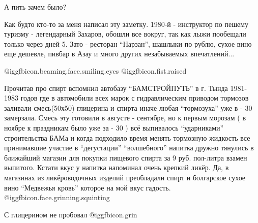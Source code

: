\begin{itemize}
А пить зачем было?


Как будто кто-то за меня написал эту заметку. 1980-й - инструктор по пешему
туризму - легендарный Захаров, обошли все вокруг, так как лыжи пообещали только
через дней 5. Зато - ресторан \enquote{Нарзан}, шашлыки по рублю, сухое вино еще
дешевле, пивбар в Азау и много других незабываемых впечатлений...

 @igg{fbicon.beaming.face.smiling.eyes}  @igg{fbicon.fist.raised} 


Прочитав про спирт вспомнил автобазу \enquote{БАМСТРОЙПУТЬ} в г. Тында 1981- 1983 годов
где в автомобили всех марок с гидравлическим приводом тормозов заливали
смесь(50х50) глицерина и спирта иначе любая \enquote{тормозуха} уже в - 30 замерзала.
Смесь эту готовили в августе - сентябре, но к первым морозам ( в ноябре к
праздникам было уже за - 30 ) всё выпивалось \enquote{ударниками} строительства БАМа и
когда подходило время менять тормозную жидкость все принимавшие участие в
\enquote{дегустации} \enquote{волшебного} напитка дружно тянулись в ближайший магазин для
покупки пищевого спирта за 9 руб. пол-литра взамен выпитого. Кстати вкус у
напитка напоминал очень крепкий ликёр. Да, в магазинах из ликёроводочных
изделий преобладали спирт и болгарское сухое вино \enquote{Медвежья кровь} которое на
мой вкус гадость. @igg{fbicon.face.grinning.squinting} 


С глицерином не пробовал @igg{fbicon.grin} 

\end{itemize} %
